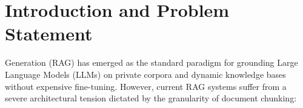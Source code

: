 \documentclass[10pt,journal,compsoc]{IEEEtran}
\begin{document}
\maketitle

\IEEEdisplaynontitleabstractindextext
\IEEEpeerreviewmaketitle

\section{Introduction and Problem Statement}
 Generation (RAG) has emerged as the standard paradigm for grounding Large Language Models (LLMs) on private corpora and dynamic knowledge bases without expensive fine-tuning. However, current RAG systems suffer from a severe architectural tension dictated by the granularity of document chunking:
\end{document}
